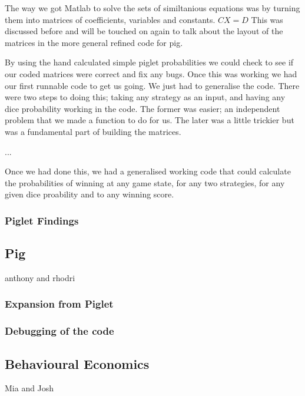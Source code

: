 \documentclass[a4paper,titlepage]{article}
\begin{document}
The way we got Matlab to solve the sets of similtanious equations was by turning them into
matrices of coefficients, variables and constants. $CX=D$ This was discussed before
and will be touched on again to talk about the layout of the matrices in the more general
refined code for pig.

By using the hand calculated simple piglet probabilities we could check to see if our
coded matrices were correct and fix any bugs. Once this was working we had our first
runnable code to get us going. We just had to generalise the code.
There were two steps to doing this; taking any strategy as an input, and having any
dice probability working in the code. The former was easier; an independent problem that we
made a function to do for us. The later was a little trickier but was a fundamental part
of building the matrices.



...

Once we had done this, we had a generalised working code that could calculate the
probabilities of winning at any game state, for any two strategies, for any given
dice proability and to any winning score.

\subsubsection{Piglet Findings}

\subsection{Pig}
anthony and rhodri
\subsubsection{Expansion from Piglet}


\subsubsection{Debugging of the code}
\subsection{Behavioural Economics}
Mia and Josh
\end{document}

